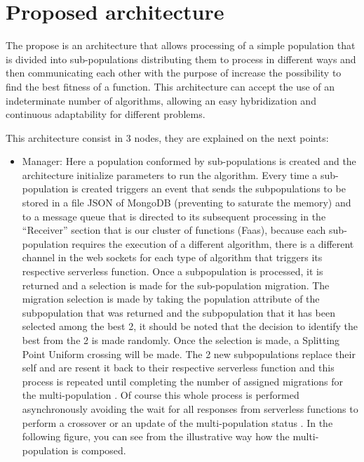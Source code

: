 \documentclass[runningheads]{llncs}
\begin{document}
\section{Proposed architecture}

The propose is an architecture that allows processing of a simple population
that is divided into sub-populations distributing them to process in different
ways and then communicating each other with the purpose of increase the
possibility to find the best fitness of a function. This architecture can accept
the use of an indeterminate number of algorithms, allowing an easy hybridization
and continuous adaptability for different problems.

This architecture consist in 3 nodes, they are explained on the next points:

\begin{itemize}
  \item Manager: 
  Here a population conformed by sub-populations is created and the architecture
  initialize parameters to run the algorithm. Every time a sub-population is
  created triggers an event that sends the subpopulations to be stored in a file
  JSON of MongoDB (preventing to saturate the memory) and to a message queue
  that is directed to its subsequent processing in the “Receiver” section that
  is our cluster of functions (Faas), because each sub-population requires the
  execution of a different algorithm, there is a different channel in the web
  sockets for each type of algorithm that triggers its respective serverless
  function. Once a subpopulation is processed, it is returned and a selection is
  made for the sub-population migration. The migration selection is made by
  taking the population attribute of the subpopulation that was returned and the
  subpopulation that it has been selected among the best 2, it should be noted
  that the decision to identify the best from the 2 is made randomly. Once the
  selection is made, a Splitting Point Uniform crossing will be made. The 2 new
  subpopulations replace their self and are resent it back to their respective
  serverless function and this process is repeated until completing the number
  of assigned migrations for the multi-population
  \cite{Ma2019,Santander-jim2018}. Of course this whole process is performed
  asynchronously avoiding the wait for all responses from serverless functions
  to perform a crossover or an update of the multi-population status
  \cite{Lovbjerg2001,Jimeno2019}. In the following figure, you can see from the
  illustrative way how the multi-population is composed.

\end{itemize}
\end{document}
